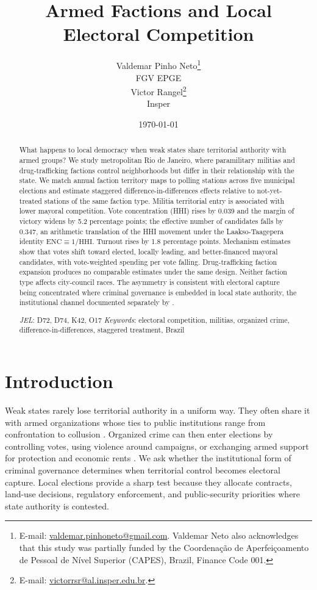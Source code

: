 \documentclass[11pt]{article}
\title{\textbf{Armed Factions and Local Electoral Competition}}
\author{
	\begin{minipage}[t]{0.33\textwidth}
		\centering
		Valdemar Pinho Neto\footnote{E-mail: \href{mailto:valdemar.pinhoneto@gmail.com}{valdemar.pinhoneto@gmail.com}. Valdemar Neto also acknowledges that this study was partially funded by the Coordenação de Aperfeiçoamento de Pessoal de Nível Superior (CAPES), Brazil, Finance Code 001.}\\[0.25em]
		\small FGV EPGE
	\end{minipage}
	\vspace{1em}
        \begin{minipage}[t]{0.33\textwidth}
		\centering
		Victor Rangel\footnote{E-mail: \href{mailto:victorrsr@al.insper.edu.br}{victorrsr@al.insper.edu.br}.}\\[0.25em]
		\small Insper
	\end{minipage}
	\vspace{1em}
}
\date{\today}
\begin{document}
\maketitle

\begin{abstract}
\noindent What happens to local democracy when weak states share territorial authority with armed groups? We study metropolitan Rio de Janeiro, where paramilitary militias and drug-trafficking factions control neighborhoods but differ in their relationship with the state. We match annual faction territory maps to polling stations across five municipal elections and estimate staggered difference-in-differences effects relative to not-yet-treated stations of the same faction type. Militia territorial entry is associated with lower mayoral competition. Vote concentration (HHI) rises by 0.039 and the margin of victory widens by 5.2 percentage points; the effective number of candidates falls by 0.347, an arithmetic translation of the HHI movement under the Laakso-Taagepera identity $\text{ENC}\equiv 1/\text{HHI}$. Turnout rises by 1.8 percentage points. Mechanism estimates show that votes shift toward elected, locally leading, and better-financed mayoral candidates, with vote-weighted spending per vote falling. Drug-trafficking faction expansion produces no comparable estimates under the same design. Neither faction type affects city-council races. The asymmetry is consistent with electoral capture being concentrated where criminal governance is embedded in local state authority, the institutional channel documented separately by \citet{pantaleao2025elections}.

\vspace{4pt}
\noindent\textit{JEL}: D72, D74, K42, O17 \quad \textit{Keywords}: electoral competition, militias, organized crime, difference-in-differences, staggered treatment, Brazil
\end{abstract}

\vspace{-6pt}
\section{Introduction}

Weak states rarely lose territorial authority in a uniform way. They often share it with armed organizations whose ties to public institutions range from confrontation to collusion \citep{acemoglu2020weak, blattman2025gangrule}. Organized crime can then enter elections by controlling votes, using violence around campaigns, or exchanging armed support for protection and economic rents \citep{defeo2017mafia, alesina2019organized, acemoglu2013monopoly}. We ask whether the institutional form of criminal governance determines when territorial control becomes electoral capture. Local elections provide a sharp test because they allocate contracts, land-use decisions, regulatory enforcement, and public-security priorities where state authority is contested.
\end{document}
